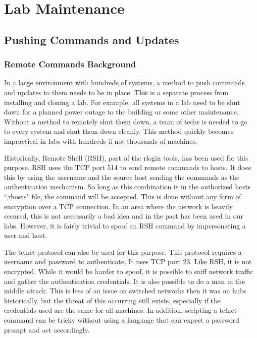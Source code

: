 \chapter{Lab Maintenance} \label{ch:lab_maintenance}
\section{Pushing Commands and Updates} \label{sec:ssh_push}
\subsection{Remote Commands Background}
In a large environment with hundreds of systems, a method to push commands and updates to them needs to be in place.  This is a separate process from installing and cloning a lab.  For example, all systems in a lab need to be shut down for a planned power outage to the building or some other maintenance.  Without a method to remotely shut them down, a team of techs is needed to go to every system and shut them down cleanly.  This method quickly becomes impractical in labs with hundreds if not thousands of machines.  

Historically, Remote Shell (RSH), part of the rlogin tools, has been used for this purpose.  RSH uses the TCP port 514 to send remote commands to hosts.  It does this by using the username and the source host sending the commands as the authentication mechanism.  So long as this combination is in the authorized hosts ``.rhosts" file, the command will be accepted.  This is done without any form of encryption over a TCP connection.  In an area where the network is heavily secured, this is not necessarily a bad idea and in the past has been used in our labs.  However, it is fairly trivial to spoof an RSH command by impersonating a user and host.  

The telnet protocol can also be used for this purpose.  This protocol requires a username and password to authenticate.  It uses TCP port 23.  Like RSH, it is not encrypted.  While it would be harder to spoof, it is possible to sniff network traffic and gather the authentication credentials.  It is also possible to do a man in the middle attack.  This is less of an issue on switched networks then it was on hubs historically, but the threat of this occurring still exists, especially if the credentials used are the same for all machines.  In addition, scripting a telnet command can be tricky without using a language that can expect a password prompt and act accordingly.

